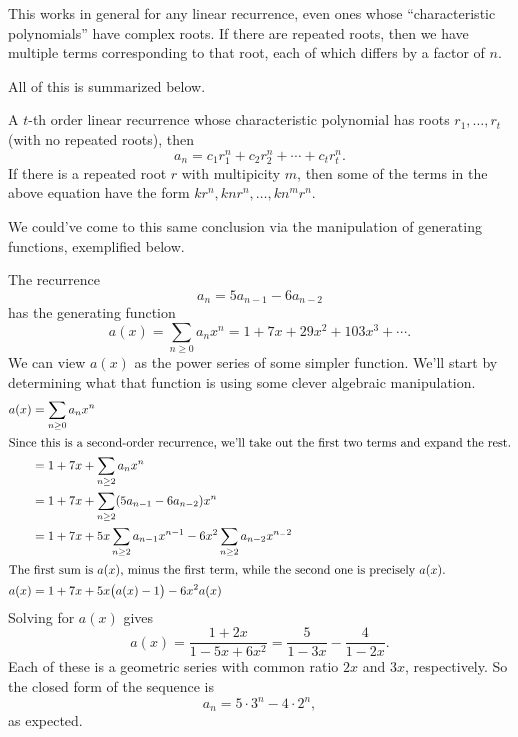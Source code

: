 \documentclass[../m055main.tex]{subfiles}
\begin{document}
This works in general for any linear recurrence, even ones whose ``characteristic polynomials'' have complex roots.
If there are repeated roots, then we have multiple terms corresponding to that root, each of which differs by a factor of $n$.

All of this is summarized below.

\begin{theorem}
    A $t$-th order linear recurrence whose characteristic polynomial has roots $r_1, \ldots, r_t$ (with no repeated roots), then
    \[ a_n = c_1 r_1^{n} + c_2 r_2^{n} + \cdots + c_t r_t^{n}. \]
    If there is a repeated root $r$ with multipicity $m$, then some of the terms in the above equation have the form $k r^{n}, k n r^{n}, \ldots, k n^{m} r^{n}$.
\end{theorem}

We could've come to this same conclusion via the manipulation of generating functions, exemplified below.

\begin{example}
    The recurrence
    \[ a_n = 5a_{n-1} - 6a_{n-2} \]
    has the generating function
    \[ a(x) = \sum_{n \geq 0} a_n x^{n} = 1 + 7x + 29x^2 + 103x^3 + \cdots. \]
    We can view $a(x)$ as the power series of some simpler function.
    We'll start by determining what that function is using some clever algebraic manipulation.
    \begin{align*}
        a(x) &= \sum_{n \geq 0} a_n x^{n} \\
        \intertext{Since this is a second-order recurrence, we'll take out the first two terms and expand the rest.}
        &= 1 + 7x + \sum_{n \geq 2} a_n x^{n} \\
        &= 1 + 7x + \sum_{n \geq 2} (5a_{n-1} - 6a_{n-2}) x^{n} \\
        &= 1 + 7x + 5x \sum_{n \geq 2} a_{n-1} x^{n-1} - 6x^2 \sum_{n \geq 2} a_{n-2} x^{n_-2} \\
        \intertext{The first sum is $a(x)$, minus the first term, while the second one is precisely $a(x)$.}
        a(x) &= 1 + 7x + 5x \big( a(x) - 1 \big) - 6x^2 a(x)
    \end{align*}
    Solving for $a(x)$ gives
    \[ a(x) = \frac{1 + 2x}{1 - 5x + 6x^2} = \frac{5}{1 - 3x} - \frac{4}{1 - 2x}. \]
    Each of these is a geometric series with common ratio $2x$ and $3x$, respectively.
    So the closed form of the sequence is
    \[ a_n = 5 \cdot 3^{n} - 4 \cdot 2^{n}, \]
    as expected.
\end{example}
\end{document}
